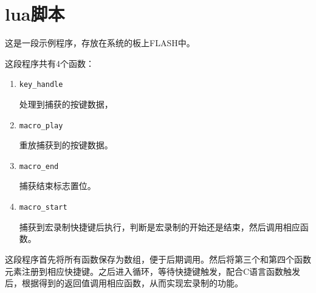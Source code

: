 \section{lua脚本}

这是一段示例程序，存放在系统的板上FLASH中。

这段程序共有4个函数：

\begin{enumerate}
\item \verb|key_handle|

处理到捕获的按键数据，
\item \verb|macro_play|

重放捕获到的按键数据。

\item \verb|macro_end|

捕获结束标志置位。

\item \verb|macro_start|

捕获到宏录制快捷键后执行，判断是宏录制的开始还是结束，然后调用相应函数。

\end{enumerate}

这段程序首先将所有函数保存为数组，便于后期调用。然后将第三个和第四个函数元素注册到相应快捷键。之后进入循环，等待快捷键触发，配合C语言函数触发后，根据得到的返回值调用相应函数，从而实现宏录制的功能。







